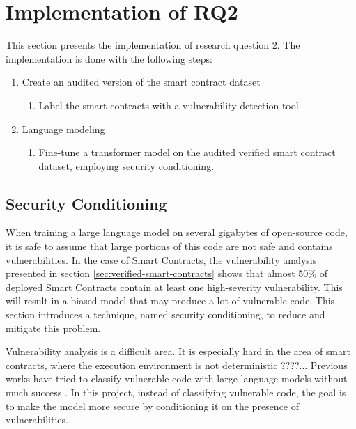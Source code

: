 %


\section{Implementation of RQ2}
This section presents the implementation of research question 2. The implementation is done with the following steps:
\begin{enumerate}
    \item Create an audited version of the smart contract dataset
    \begin{enumerate}
        \item Label the smart contracts with a vulnerability detection tool.
    \end{enumerate}
    \item Language modeling
    \begin{enumerate}
        \item Fine-tune a transformer model on the audited verified smart contract dataset, employing security conditioning.
    \end{enumerate}
\end{enumerate}

\subsection{Security Conditioning}
\label{sec:security-conditioning}
When training a large language model on several gigabytes of open-source code, it is safe to assume that large portions of this code are not safe and contains vulnerabilities. In the case of Smart Contracts, the vulnerability analysis presented in section \ref{sec:verified-smart-contracts} shows that almost 50\% of deployed Smart Contracts contain at least one high-severity vulnerability. This will result in a biased model that may produce a lot of vulnerable code. This section introduces a technique, named security conditioning, to reduce and mitigate this problem.

Vulnerability analysis is a difficult area. It is especially hard in the area of smart contracts, where the execution environment is not deterministic ????... Previous works have tried to classify vulnerable code with large language models without much success . In this project, instead of classifying vulnerable code, the goal is to make the model more secure by conditioning it on the presence of vulnerabilities.

